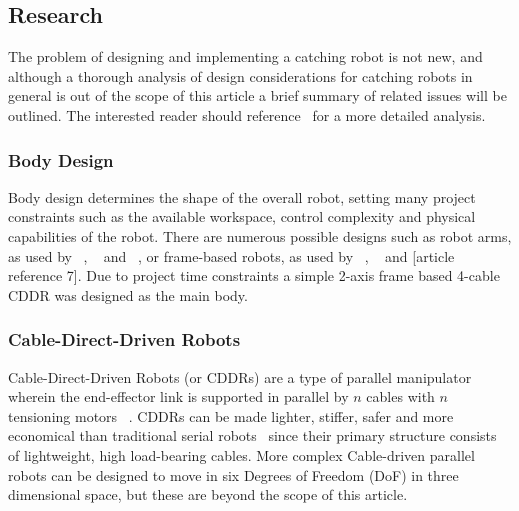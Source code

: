 \documentclass[conference]{IEEEtran}
\begin{document}
	\subsection{Research}\label{research}
	The problem of designing and implementing a catching robot is not new, and although a thorough analysis of design considerations for catching robots in general is out of the scope of this article a brief summary of related issues will be outlined. The interested reader should reference~\cite{Sorg2003VisualTA} for a more detailed analysis.
	
	\subsubsection{Body Design}
	Body design determines the shape of the overall robot, setting many project constraints such as the available workspace, control complexity and physical capabilities of the robot. There are numerous possible designs such as robot arms, as used by ~\cite{6810147}, ~\cite{malzahn2014modeling} and ~\cite{5980073}, or frame-based robots, as used by ~\cite{6385963}, ~\cite{forpheus} and [article reference 7]. Due to project time constraints a simple 2-axis frame based 4-cable CDDR was designed as the main body.
	
	\subsubsection{Cable-Direct-Driven Robots}
	Cable-Direct-Driven Robots (or CDDRs) are a type of parallel manipulator wherein the end-effector link is supported in parallel by $n$ cables with $n$ tensioning motors ~\cite{CDDR:description}. CDDRs can be made lighter, stiffer, safer and more economical than traditional serial robots~\cite{WilliamsII2003} since their primary structure consists of lightweight, high load-bearing cables. More complex Cable-driven parallel robots can be designed to move in six Degrees of Freedom (DoF) in three dimensional space, but these are beyond the scope of this article. 
	
\end{document}
